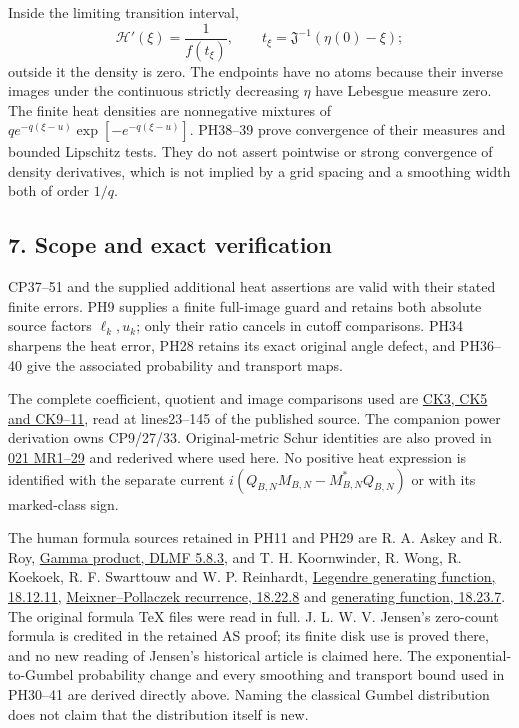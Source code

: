 \documentclass[10pt]{article}
\begin{document}
Inside the limiting transition interval, \[
 \mathcal H'(\xi)=\frac1{f(t_\xi)},\qquad
 t_\xi=\mathfrak J^{-1}(\eta(0)-\xi);
 \tag{PH41}
\] outside it the density is zero. The endpoints have no atoms because their inverse images under the continuous strictly decreasing \(\eta\) have Lebesgue measure zero. The finite heat densities are nonnegative mixtures of \(q e^{-q(\xi-u)}\exp[-e^{-q(\xi-u)}]\). PH38--39 prove convergence of their measures and bounded Lipschitz tests. They do not assert pointwise or strong convergence of density derivatives, which is not implied by a grid spacing and a smoothing width both of order \(1/q\).

\subsection{7. Scope and exact verification}\label{scope-and-exact-verification}

CP37--51 and the supplied additional heat assertions are valid with their stated finite errors. PH9 supplies a finite full-image guard and retains both absolute source factors \(\ell_k,u_k\); only their ratio cancels in cutoff comparisons. PH34 sharpens the heat error, PH28 retains its exact original angle defect, and PH36--40 give the associated probability and transport maps.

The complete coefficient, quotient and image comparisons used are \href{https://github.com/KokunoYumeto/zeta-function-research-reader/blob/1447462732b40b1474bd9a819cf79257f5326ada/workbenches/splitzero-tandem/continuations/20260922-kernel-frequency/COMBINED_KERNEL_AND_RECEIVERS.md\#L30}{CK3, CK5 and CK9--11}, read at lines23--145 of the published source. The companion power derivation owns CP9/27/33. Original-metric Schur identities are also proved in \href{https://github.com/KokunoYumeto/zeta-function-research-reader/blob/e40b46fde72c245dd79ef5691f59c21d6cbf0c75/workbenches/splitzero-tandem/continuations/20260922-original-observation-recovery/MATRIX_RECOVERY_PROOFS.md}{021 MR1--29} and rederived where used here. No positive heat expression is identified with the separate current \(i(Q_{B,N}M_{B,N}-M_{B,N}^*Q_{B,N})\) or with its marked-class sign.

The human formula sources retained in PH11 and PH29 are R. A. Askey and R. Roy, \href{https://dlmf.nist.gov/5.8.E3}{Gamma product, DLMF 5.8.3}, and T. H. Koornwinder, R. Wong, R. Koekoek, R. F. Swarttouw and W. P. Reinhardt, \href{https://dlmf.nist.gov/18.12.E11}{Legendre generating function, 18.12.11}, \href{https://dlmf.nist.gov/18.22.E8}{Meixner--Pollaczek recurrence, 18.22.8} and \href{https://dlmf.nist.gov/18.23.E7}{generating function, 18.23.7}. The original formula TeX files were read in full. J. L. W. V. Jensen's zero-count formula is credited in the retained AS proof; its finite disk use is proved there, and no new reading of Jensen's historical article is claimed here. The exponential-to-Gumbel probability change and every smoothing and transport bound used in PH30--41 are derived directly above. Naming the classical Gumbel distribution does not claim that the distribution itself is new.
\end{document}
